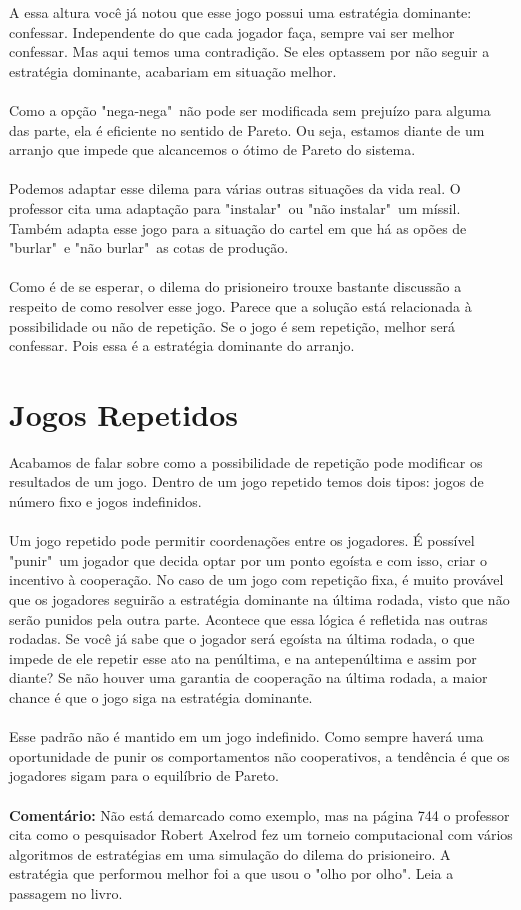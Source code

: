 \documentclass[a4paper,11pt,oneside]{book}
\theoremstyle{definition}
\theoremstyle{break}
\begin{document}
A essa altura você já notou que esse jogo possui uma estratégia dominante: confessar. Independente do que cada jogador faça, sempre vai ser melhor confessar. Mas aqui temos uma contradição. Se eles optassem por não seguir a estratégia dominante, acabariam em situação melhor.
\\~\\
Como a opção "nega-nega"\ não pode ser modificada sem prejuízo para alguma das parte, ela é eficiente no sentido de Pareto. Ou seja, estamos diante de um arranjo que impede que alcancemos o ótimo de Pareto do sistema.
\\~\\
Podemos adaptar esse dilema para várias outras situações da vida real. O professor cita uma adaptação para "instalar"\ ou "não instalar"\ um míssil. Também adapta esse jogo para a situação do cartel em que há as opões de "burlar"\ e "não burlar"\ as cotas de produção.
\\~\\
Como é de se esperar, o dilema do prisioneiro trouxe bastante discussão a respeito de como resolver esse jogo. Parece que a solução está relacionada à possibilidade ou não de repetição. Se o jogo é sem repetição, melhor será confessar. Pois essa é a estratégia dominante do arranjo.

\section{Jogos Repetidos}

Acabamos de falar sobre como a possibilidade de repetição pode modificar os resultados de um jogo. Dentro de um jogo repetido temos dois tipos: jogos de número fixo e jogos indefinidos.
\\~\\
Um jogo repetido pode permitir coordenações entre os jogadores. É possível "punir"\ um jogador que decida optar por um ponto egoísta e com isso, criar o incentivo à cooperação. No caso de um jogo com repetição fixa, é muito provável que os jogadores seguirão a estratégia dominante na última rodada, visto que não serão punidos pela outra parte. Acontece que essa lógica é refletida nas outras rodadas. Se você já sabe que o jogador será egoísta na última rodada, o que impede de ele repetir esse ato na penúltima, e na antepenúltima e assim por diante? Se não houver uma garantia de cooperação na última rodada, a maior chance é que o jogo siga na estratégia dominante.
\\~\\
Esse padrão não é mantido em um jogo indefinido. Como sempre haverá uma oportunidade de punir os comportamentos não cooperativos, a tendência é que os jogadores sigam para o equilíbrio de Pareto.
\\~\\
\textbf{Comentário:} Não está demarcado como exemplo, mas na página 744 o professor cita como o pesquisador Robert Axelrod fez um torneio computacional com vários algoritmos de estratégias em uma simulação do dilema do prisioneiro. A estratégia que performou melhor foi a que usou o "olho por olho". Leia a passagem no livro.
\end{document}
